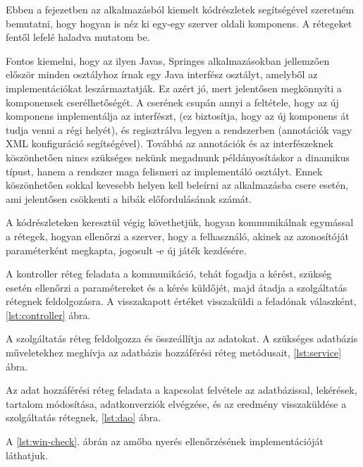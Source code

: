 Ebben a fejezetben az alkalmazásból kiemelt kódrészletek segítségével szeretném bemutatni, hogy hogyan is néz ki egy-egy szerver oldali komponens. A rétegeket fentől lefelé haladva mutatom be.

Fontos kiemelni, hogy az ilyen Javas, Springes alkalmazásokban jellemzően először minden osztályhoz írnak egy Java interfész osztályt, amelyből az implementációkat leszármaztatják. Ez azért jó, mert jelentősen megkönnyíti a komponensek cserélhetőségét. A cserének csupán annyi a feltétele, hogy az új komponens implementálja az interfészt, (ez biztosítja, hogy az új komponens át tudja venni a régi helyét), és regisztrálva legyen a rendszerben (annotációk vagy XML konfiguráció segítségével). Továbbá az annotációk és az interfészeknek köszönhetően nincs szükséges nekünk megadnunk példányosításkor a dinamikus típust, hanem a rendszer maga felismeri az implementáló osztályt. Ennek köszönhetően sokkal kevesebb helyen kell beleírni az alkalmazásba csere esetén, ami jelentősen csökkenti a hibák előfordulásának számát.

A kódrészleteken keresztül végig követhetjük, hogyan kommunikálnak egymással a rétegek, hogyan ellenőrzi a szerver, hogy a felhasználó, akinek az azonosítóját paraméterként megkapta, jogosult -e új játék kezdésére.

A kontroller réteg feladata a kommunikáció, tehát fogadja a kérést, szükség esetén ellenőrzi a paramétereket és a kérés küldőjét, majd átadja a szolgáltatás rétegnek feldolgozásra. A visszakapott értéket visszaküldi a feladónak válaszként, \ref{lst:controller} ábra.


A szolgáltatás réteg feldolgozza és összeállítja az adatokat. A szükséges adatbázis műveletekhez meghívja az adatbázis hozzáférési réteg metódusait, \ref{lst:service} ábra.


Az adat hozzáférési réteg feladata a kapcsolat felvétele az adatbázissal, lekérések, tartalom módosítása, adatkonverziók elvégzése, és az eredmény visszaküldése a szolgáltatás rétegnek,  \ref{lst:dao} ábra.


A \ref{lst:win-check}. ábrán az amőba nyerés ellenőrzésének implementációját láthatjuk.



















